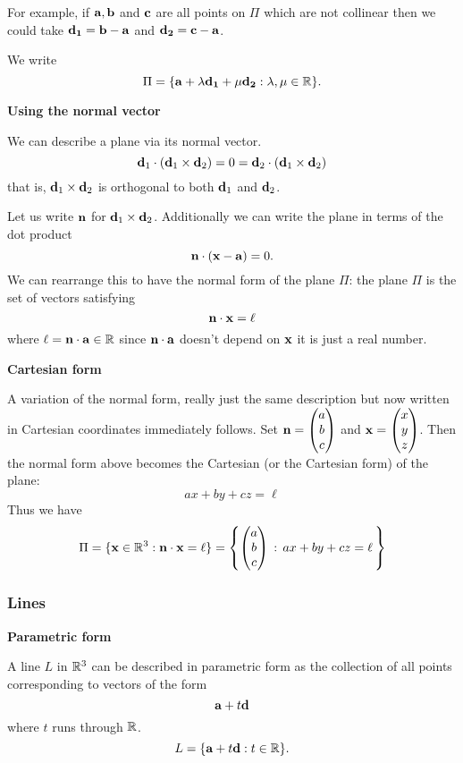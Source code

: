 \documentclass[10pt, a4paper]{article}
\begin{document}
For example, if $\mathbf{a, b}$ and $\mathbf{c}$ are all points on $\Pi$ which are not collinear then we could take $\mathbf{d_1 = b - a}$ and $\mathbf{d_2 = c - a}$.

We write
\[
\Pi = \{\mathbf{a} + \lambda\mathbf{d_1} + \mu\mathbf{d_2} : \lambda, \mu \in \mathbb{R}\}.
\]

\textbf{Using the normal vector}

We can describe a plane via its normal vector.
\[
\mathbf{d}_1 \cdot (\mathbf{d}_1 \times \mathbf{d}_2) = 0 = \mathbf{d}_2 \cdot (\mathbf{d}_1 \times \mathbf{d}_2)
\]
that is, $\mathbf{d}_1 \times \mathbf{d}_2$ is orthogonal to both $\mathbf{d}_1$ and $\mathbf{d}_2$.

Let us write $\mathbf{n}$ for $\mathbf{d}_1 \times \mathbf{d}_2$. Additionally we can write the plane in terms of the dot product
\[
\mathbf{n \cdot(x - a)} = 0.
\]
We can rearrange this to have the normal form of the plane $\Pi$: the plane $\Pi$ is the set of vectors satisfying
\[
\mathbf{n \cdot x} = \ell
\]
where $\ell = \mathbf{n \cdot a} \in \mathbb{R}$ since $\mathbf{n \cdot a}$ doesn't depend on $\mathbf{x}$ it is just a real number.


\textbf{Cartesian form}

A variation of the normal form, really just the same description but now written in Cartesian coordinates immediately follows. Set $\mathbf{n} = \begin{pmatrix} a \\ b \\ c \end{pmatrix}$ and $\mathbf{x} = \begin{pmatrix} x \\ y \\ z \end{pmatrix}$. Then the normal form above becomes the Cartesian (or the Cartesian form) of the plane:
\[
ax + by + cz = \ell
\]
Thus we have
\[
\Pi = \{\mathbf{x} \in \mathbb{R} ^ 3 : \mathbf{n \cdot x} = \ell\} = \left\{\begin{pmatrix} a \\ b \\ c \end{pmatrix}\,:\,ax + by + cz = \ell\,\right\}
\]

\subsubsection{Lines}
\textbf{Parametric form}

A line $L$ in $\mathbb{R} ^ 3$ can be described in parametric form as the collection of all points corresponding to vectors of the form
\[
\mathbf{a} + t\mathbf{d}
\]
where $t$ runs through $\mathbb{R}$.
\[
L = \{\mathbf{a} + t\mathbf{d} : t \in \mathbb{R}\}.
\]
\end{document}
